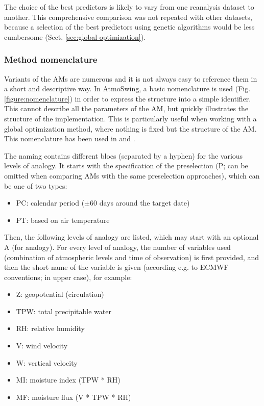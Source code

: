 \documentclass[gmd]{copernicus}
\begin{document}
The choice of the best predictors is likely to vary from one reanalysis dataset to another. This comprehensive comparison was not repeated with other datasets, because a selection of the best predictors using genetic algorithms would be less cumbersome (Sect. \ref{sec:global-optimization}).


\subsubsection{Method nomenclature}

Variants of the AMs are numerous and it is not always easy to reference them in a short and descriptive way. In AtmoSwing, a basic nomenclature is used (Fig. \ref{figure:nomenclature}) in order to express the structure into a simple identifier. This cannot describe all the parameters of the AM, but quickly illustrates the structure of the implementation. This is particularly useful when working with a global optimization method, where nothing is fixed but the structure of the AM. This nomenclature has been used in \citet{Horton2017a, Horton2017b, Horton2018a} and \citet{Horton2018b}.

The naming contains different blocs (separated by a hyphen) for the various levels of analogy. It starts with the specification of the preselection (P; can be omitted when comparing AMs with the same preselection approaches), which can be one of two types:
\begin{itemize}
	\item PC: calendar period ($\pm 60$ days around the target date)
	\item PT: based on air temperature \citep{BenDaoud2010}
\end{itemize}

Then, the following levels of analogy are listed, which may start with an optional A (for analogy). For every level of analogy, the number of variables used (combination of atmospheric levels and time of observation) is first provided, and then the short name of the variable is given (according e.g. to ECMWF conventions; in upper case), for example:
\begin{itemize}
	\item Z: geopotential (circulation)
	\item TPW: total precipitable water
	\item RH: relative humidity
	\item V: wind velocity
	\item W: vertical velocity
	\item MI: moisture index (TPW * RH)
	\item MF: moisture flux (V * TPW * RH)
\end{itemize}
\end{document}
